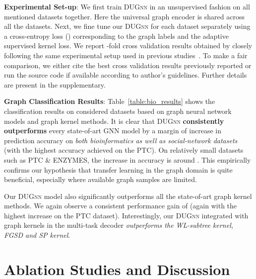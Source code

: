\documentclass{article}
\begin{document}
\noindent \textbf{Experimental Set-up}: We first train \textsc{DUGnn} in an unsupervised fashion on   all mentioned datasets together. Here the universal graph encoder   is shared across all the datasets. Next, we fine tune our  \textsc{DUGnn} for each dataset separately using a  cross-entropy loss () corresponding to the graph labels and the adaptive supervised kernel loss.  We report  -fold cross validation results obtained by closely following the same experimental setup used in previous studies~\cite{ying2018hierarchical, xu2018powerful}.
To make a fair comparison, we either cite  the best cross validation results  previously reported   or run the source code if available according to author's guidelines.  Further   details  are   present in the supplementary. 


\noindent \textbf{Graph Classification Results}: Table~\ref{table:bio_results} shows the classification   results on  considered   datasets based on graph neural network models and graph kernel methods. It is clear that \textsc{DUGnn}  \textbf{consistently outperforms} every state-of-art  GNN model  by a margin of   increase in prediction accuracy on \emph{both bioinformatics  as well as  social-network datasets} (with the highest accuracy achieved  on the {\selectfont PTC}).
On relatively  small datasets such as {\selectfont PTC \& ENZYMES},   the increase  in accuracy is around . This empirically confirms our hypothesis that transfer learning in the graph domain  is quite   beneficial,  especially where available graph samples are limited. 

Our \textsc{DUGnn} model  also  significantly outperforms all the state-of-art graph kernel methods. We again  observe a consistent performance gain of     (again with the highest increase on the  {\selectfont PTC} dataset). Interestingly, our \textsc{DUGnn} integrated with graph kernels in the multi-task decoder \emph{outperforms the  WL-subtree  kernel, FGSD and SP  kernel}.





















\section{Ablation Studies and Discussion}\label{sec:ablation_study}
\end{document}
